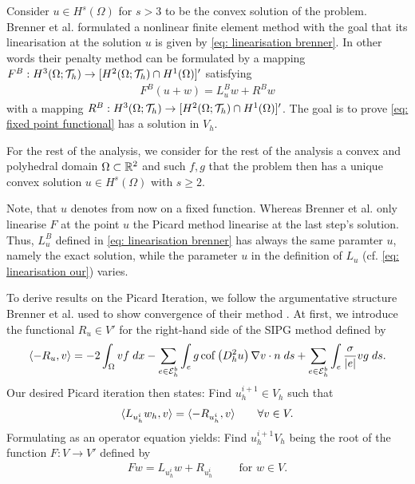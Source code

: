 Consider $u\in H^s(\Omega)$ for $s>3$ to be the convex solution of the \MA problem. Brenner et al. formulated a nonlinear finite element method with the goal that its linearisation at the solution $u$ is given by \eqref{eq: linearisation brenner}. In other words their penalty method can be formulated by a mapping $F^B:H^3(\Omega; \mathcal{T}_h) \rightarrow [H^2(\Omega; \mathcal{T}_h) \cap H^1(\Omega)]'$ satisfying
 \begin{align}
 	F^B(u +w ) = L^B_u w + R^Bw \label{eq: add brenner method}
 \end{align}
 with a mapping $R^B:H^3(\Omega; \mathcal{T}_h) \rightarrow [H^2(\Omega; \mathcal{T}_h) \cap H^1(\Omega)]'$. 
% 
The goal is to prove \eqref{eq: fixed point functional} has a solution in $V_h$. 

For the rest of the analysis, we consider for the rest of the analysis a convex and polyhedral domain $\Omega\subset \mathbb{R}^2$ and such $f,g$ that the \MA problem then has a unique convex solution $u \in H^s(\Omega)$ with $s\geq 2$. 

Note, that $u$ denotes from now on a fixed function. Whereas Brenner et al. only linearise $F$ at the point $u$ the Picard method linearise at the last step's solution. Thus, $L_u^B$ defined in \eqref{eq: linearisation brenner} has always the same paramter $u$, namely the exact solution, while the parameter $u$ in the definition of $L_u$ (cf. \eqref{eq: linearisation our}) varies. 

To derive results on the Picard Iteration, we follow the argumentative structure Brenner et al. used to show convergence of their method \cite{BGN+2011}. At first, we introduce the functional $R_u \in V'$ for the right-hand side of the SIPG method defined by
\[
 \langle -R_u, v \rangle = - 2 \int_{\Omega} {{v f}\;dx}
-\sum\limits_{e \in \mathcal{E}_h^b}\int_{e} {{ g \operatorname{cof} \left( D_h^2 u \right) \nabla v \cdot n }\;ds}
+\sum\limits_{e \in \mathcal{E}_h^b} \int_{e} {{ \frac \sigma {|e|} v g}\;ds}. \label{eq: definition R}
\]
Our desired Picard iteration then states: Find $u^{i+1}_h \in V_h$ such that
\begin{align}
 \langle L_{u^i_h} w_h, v \rangle =   \langle -R_{u^i_h}, v \rangle   \qquad \forall v \in V. \label{eq: fixed point functional}
\end{align}
Formulating as an operator equation yields: Find $u_h^{i+1}V_h$ being the root of the function $F:V \rightarrow V'$ defined by
\begin{align*}
 {Fw} =  L_{u^i_h} w + R_{u^i_h}  \qquad \text{ for } w \in V.
\end{align*}

